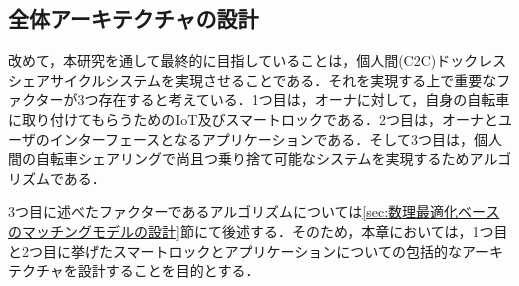   \subsection{全体アーキテクチャの設計}
    \label{sec:全体アーキテクチャの設計}
      \par 改めて，本研究を通して最終的に目指していることは，個人間(C2C)ドックレスシェアサイクルシステムを実現させることである．それを実現する上で重要なファクターが3つ存在すると考えている．1つ目は，オーナに対して，自身の自転車に取り付けてもらうためのIoT及びスマートロックである．2つ目は，オーナとユーザのインターフェースとなるアプリケーションである．そして3つ目は，個人間の自転車シェアリングで尚且つ乗り捨て可能なシステムを実現するためアルゴリズムである．
      \par 3つ目に述べたファクターであるアルゴリズムについては\ref{sec:数理最適化ベースのマッチングモデルの設計}節にて後述する．そのため，本章においては，1つ目と2つ目に挙げたスマートロックとアプリケーションについての包括的なアーキテクチャを設計することを目的とする．


